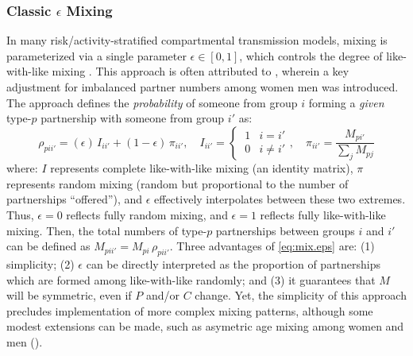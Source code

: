 \subsubsection{Classic $\epsilon$ Mixing}\label{model.par.mix.eps}
In many risk/activity-stratified compartmental transmission models,
mixing is parameterized via a single parameter $\epsilon \in [0,1]$,
which controls the degree of like-with-like mixing \cite{Nold1980}.
This approach is often attributed to \cite{Garnett1994},
wherein a key adjustment for imbalanced partner numbers among women \vs men was introduced.
The approach defines the \emph{probability} of
someone from group $i$ forming a \emph{given} type-$p$ partnership with someone from group $i'$ as:
\begin{equation}\label{eq:mix.eps}
  \rho_{pii'} = (\epsilon)\,I_{ii'} + (1 - \epsilon)\,\pi_{ii'},
  \quad I_{ii'} = \begin{cases} ~1 & i = i'\\ ~0 & i \ne i' \end{cases},
  \quad \pi_{ii'} = \frac{M_{pi'}}{\sum_{j}M_{pj}}
\end{equation}
where:
$I$ represents complete like-with-like mixing (an identity matrix),
$\pi$ represents random mixing (random but proportional to the number of partnerships ``offered''),
and $\epsilon$ effectively interpolates between these two extremes.
Thus, $\epsilon = 0$ reflects fully random mixing,
and $\epsilon = 1$ reflects fully like-with-like mixing.
Then, the total numbers of type-$p$ partnerships between groups $i$ and $i'$ can be
defined as $M_{pii'} = M_{pi}\,\rho_{pii'}$.
Three advantages of \eqref{eq:mix.eps} are:
(1) simplicity;
(2) $\epsilon$ can be directly interpreted as the proportion of partnerships
which are formed among like-with-like \vs randomly; and
(3) it guarantees that $M$ will be symmetric, even if $P$ and/or $C$ change.
Yet, the simplicity of this approach precludes implementation of more complex mixing patterns,
although some modest extensions can be made,
such as asymetric age mixing among women and men (\eg \cite{Cremin2013}).
